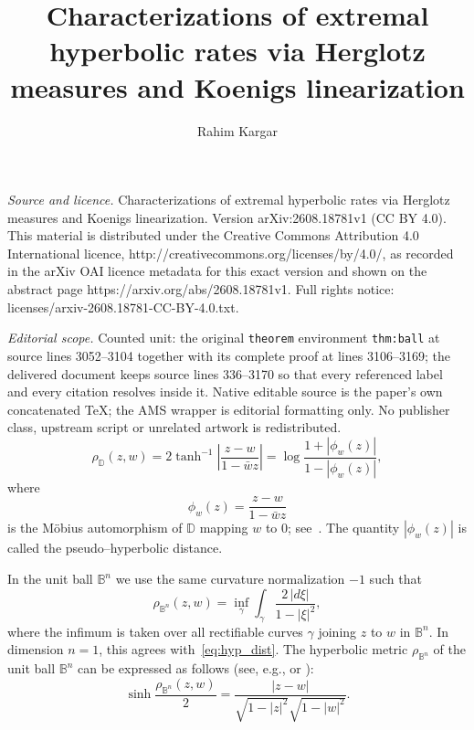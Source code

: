\documentclass[10pt,a4paper]{amsart}
\numberwithin{equation}{section}
\begin{document}
\title[Characterizations of extremal hyperbolic rates via Herglotz ]{Characterizations of extremal hyperbolic rates via Herglotz measures and Koenigs linearization}
\author{Rahim Kargar}
\date{}
\maketitle
\noindent\emph{Source and licence.} Characterizations of extremal hyperbolic rates via Herglotz measures and Koenigs linearization. Version arXiv:2608.18781v1 (CC BY 4.0). This material is distributed under the Creative Commons Attribution 4.0 International licence, http://creativecommons.org/licenses/by/4.0/, as recorded in the arXiv OAI licence metadata for this exact version and shown on the abstract page https://arxiv.org/abs/2608.18781v1. Full rights notice: licenses/arxiv-2608.18781-CC-BY-4.0.txt.\par\smallskip
\noindent\textit{Editorial scope.} Counted unit: the original \texttt{theorem} environment \texttt{thm:ball} at source lines 3052--3104 together with its complete proof at lines 3106--3169; the delivered document keeps source lines 336--3170 so that every referenced label and every citation resolves inside it. Native editable source is the paper's own concatenated TeX; the AMS wrapper is editorial formatting only. No publisher class, upstream script or unrelated artwork is redistributed.
\begin{equation}
\label{eq:hyp_dist}
\rho_{\mathbb{D}}(z,w)
=2\tanh^{-1} \left|\frac{z-w}{1-\bar w z}\right|
=\log\frac{1+|\phi_w(z)|}{1-|\phi_w(z)|},
\end{equation}
where
\begin{equation}
\label{phi}
\phi_w(z)=\frac{z-w}{1-\bar w z}
\end{equation}
is the M\"obius automorphism of $\mathbb{D}$ mapping $w$
to $0$; see~\cite[Theorem~2.2]{BM}. The quantity $|\phi_w(z)|$ is called the pseudo--hyperbolic distance.


In the unit ball $\mathbb{B}^n$ we use the same curvature
normalization $-1$ such that
\begin{equation*}
\rho_{\mathbb{B}^n}(z,w)
=\inf_\gamma\int_\gamma\frac{2\,|d\xi|}{1-|\xi|^2},
\end{equation*}
where the infimum is taken over all rectifiable curves $\gamma$
joining $z$ to $w$ in $\mathbb{B}^n$.
In dimension $n=1$, this agrees with~\eqref{eq:hyp_dist}.
The hyperbolic metric $\rho_{\mathbb{B}^n}$ of the unit ball $\mathbb{B}^n$ can be expressed as follows (see, e.g., \cite[p. 40]{B83} or \cite[p. 55]{HKV}):
\begin{equation}
\label{hyperb-unit ball}
\sinh \frac{\rho_{\mathbb{B}^n}(z,w)}{2}
=\frac{|z-w|}{\sqrt{1-|z|^2}\sqrt{1-|w|^2}}.
\end{equation}
\end{document}
